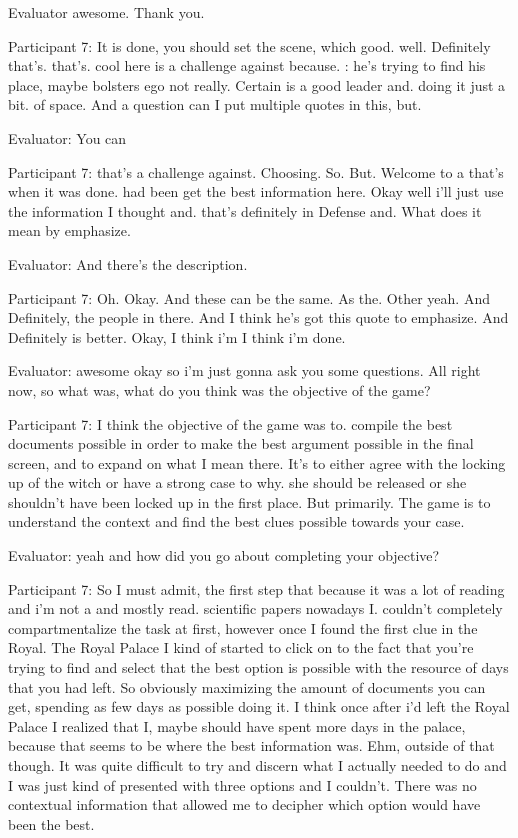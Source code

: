 \documentclass{l4proj}
\begin{document}
\begin{appendices}
Evaluator awesome. Thank you.

Participant 7: It is done, you should set the scene, which good. well. Definitely that's. that's. cool here is a challenge against because. : he's trying to find his place, maybe bolsters ego not really. Certain is a good leader and. doing it just a bit. of space. And a question can I put multiple quotes in this, but.

Evaluator: You can 

Participant 7: that's a challenge against. Choosing. So. But. Welcome to a that's when it was done. had been get the best information here. Okay well i'll just use the information I thought and. that's definitely in Defense and. What does it mean by emphasize.

Evaluator: And there's the description.

Participant 7:  Oh. Okay. And these can be the same. As the. Other yeah. And Definitely, the people in there. And I think he's got this quote to emphasize. And Definitely is better. Okay, I think i'm I think i'm done.

Evaluator: awesome okay so i'm just gonna ask you some questions. All right now, so what was, what do you think was the objective of the game?

Participant 7: I think the objective of the game was to. compile the best documents possible in order to make the best argument possible in the final screen, and to expand on what I mean there. It’s to either agree with the locking up of the witch or have a strong case to why. she should be released or she shouldn’t have been locked up in the first place. But primarily. The game is to understand the context and find the best clues possible towards your case. 

Evaluator: yeah and how did you go about completing your objective?

Participant 7: So I must admit, the first step that because it was a lot of reading and i'm not a and mostly read. scientific papers nowadays I. couldn’t completely compartmentalize the task at first, however once I found the first clue in the Royal. The Royal Palace I kind of started to click on to the fact that you're trying to find and select that the best option is possible with the resource of days that you had left. So obviously maximizing the amount of documents you can get, spending as few days as possible doing it. I think once after i'd left the Royal Palace I realized that I, maybe should have spent  more days in the palace, because that seems to be where the best information was. Ehm, outside of that though. It was quite difficult to try and discern what I actually needed to do and I was just kind of presented with three options and I couldn't. There was no contextual information that allowed me to decipher which option would have been the best.


\end{appendices}
\end{document}
